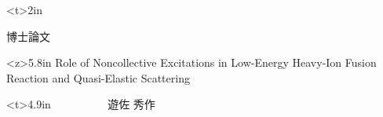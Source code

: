\documentclass[12pt]{report}
\begin{document}
\noindent
\pagestyle{empty}
\makebox
{
\begin{minipage}<t>{2in}
   \makebox
   {
     {\huge 博士論文}\ \ \ \ \ \ \
       \begin{minipage}<z>{5.8in}
       \Large{
       Role of Noncollective Excitations in Low-Energy Heavy-Ion
       Fusion Reaction and Quasi-Elastic Scattering}
       \end{minipage} 
   }\begin{minipage}<t>{4.9in}\ \ \ \
   {\huge
   \ \ \ \ \,\,\, 遊佐 秀作}
    \end{minipage} 
\end{minipage} 
}
\end{document}

